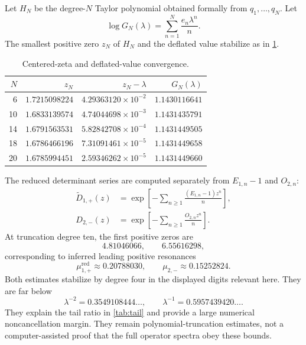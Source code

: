 \documentclass[11pt]{article}
\theoremstyle{definition}
\theoremstyle{remark}
\begin{document}
Let $H_N$ be the degree-$N$ Taylor polynomial obtained formally from
$q_1,\ldots,q_N$.  Let
\begin{equation}\label{eq:GN}
 \log G_N(\lambda)=\sum_{n=1}^N\frac{e_n\lambda^n}{n}.
\end{equation}
The smallest positive zero $z_N$ of $H_N$ and the deflated value stabilize as
in \cref{tab:zeta-convergence}.

\begin{table}[H]
\centering
\small
\caption{Centered-zeta and deflated-value convergence.}
\label{tab:zeta-convergence}
\begin{tabular}{rrrr}
\toprule
$N$ & $z_N$ & $z_N-\lambda$ & $G_N(\lambda)$\\
\midrule
6  & $1.7215098224$ & $4.29363120\times10^{-2}$ & $1.1430116641$\\
10 & $1.6833139574$ & $4.74044698\times10^{-3}$ & $1.1431435791$\\
14 & $1.6791563531$ & $5.82842708\times10^{-4}$ & $1.1431449505$\\
18 & $1.6786466196$ & $7.31091461\times10^{-5}$ & $1.1431449658$\\
20 & $1.6785994451$ & $2.59346262\times10^{-5}$ & $1.1431449660$\\
\bottomrule
\end{tabular}
\end{table}

The reduced determinant series are computed separately from
$E_{1,n}-1$ and $O_{2,n}$:
\begin{align}
 \widetilde D_{1,+}(z)
 &=\exp\left[-\sum_{n\ge1}\frac{(E_{1,n}-1)z^n}{n}\right],
 \label{eq:D1-reduced-series}\\
 D_{2,-}(z)
 &=\exp\left[-\sum_{n\ge1}\frac{O_{2,n}z^n}{n}\right].
 \label{eq:D2-series}
\end{align}
At truncation degree ten, the first positive zeros are
\begin{equation}\label{eq:fredholm-zeros-numerical}
 4.81046066,
 \qquad
 6.55616298,
\end{equation}
corresponding to inferred leading positive resonances
\begin{equation}\label{eq:resonances-numerical}
 \mu_{1,+}^{\mathrm{red}}\approx0.20788030,
 \qquad
 \mu_{2,-}\approx0.15252824.
\end{equation}
Both estimates stabilize by degree four in the displayed digits relevant
here.  They are far below
\begin{equation}\label{eq:thresholds}
 \lambda^{-2}=0.3549108444\ldots,
 \qquad
 \lambda^{-1}=0.5957439420\ldots.
\end{equation}
They explain the tail ratio in \cref{tab:tail} and provide a large numerical
noncancellation margin.  They remain polynomial-truncation estimates, not a
computer-assisted proof that the full operator spectra obey these bounds.
\end{document}
